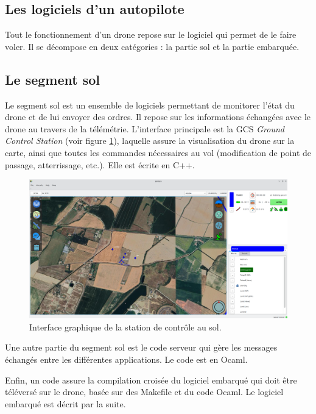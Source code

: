  \subsection{Les logiciels d'un autopilote}
 \label{sec:logiciel}
 Tout le fonctionnement d'un drone repose sur le logiciel qui permet de le faire voler. Il se décompose en deux catégories : la partie sol et la partie embarquée.

 \subsection{Le segment sol}

Le segment sol est un ensemble de logiciels permettant de monitorer l'état du drone et de lui envoyer des ordres. Il repose sur les informations échangées avec le drone au travers de la télémétrie. L'interface principale est la GCS \textit{Ground Control Station} (voir figure \ref{fig:GCS}), laquelle assure la visualisation du drone sur la carte, ainsi que toutes les commandes nécessaires au vol (modification de point de passage, atterrissage, etc.). Elle est écrite en C++.

\begin{figure}[ht!]
    \centerline{
    \includegraphics[trim=0cm 0cm 0cm 0cm,clip,width=0.8\columnwidth]{figures/GCS.png}}
    \caption{Interface graphique de la station de contrôle au sol.}
    \label{fig:GCS}
\end{figure}


Une autre partie du segment sol est le code serveur qui gère les messages échangés entre les différentes applications. Le code est en Ocaml.

Enfin, un code assure la compilation croisée du logiciel embarqué qui doit être téléversé sur le drone, basée sur des Makefile et du code Ocaml. Le logiciel embarqué est décrit par la suite.

